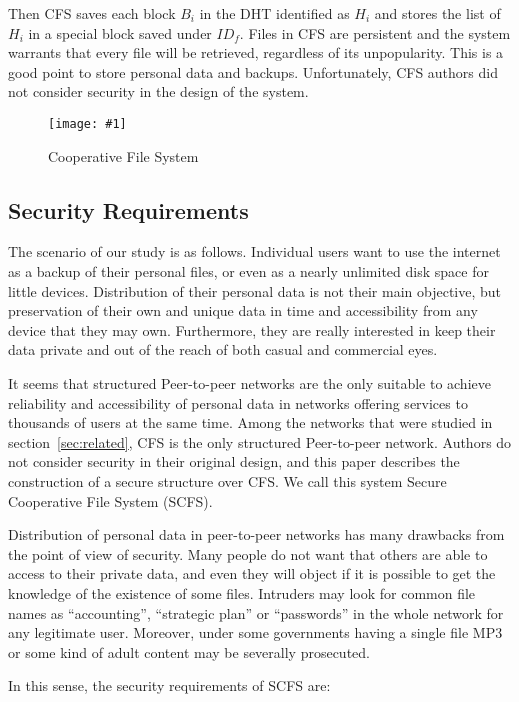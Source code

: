 \documentclass{llncs}
\newcommand{\graphfigure}[3]{%
\begin{figure}[t]%
	\centering%
	\texttt{[image: \#1]}%
	\caption{#2}%
	\label{#3}%
\end{figure}%
}
\begin{document}
Then CFS saves each block $B_i$ in the DHT identified as $H_i$ and stores the list of $H_i$ in a special block saved under $ID_f$. Files in CFS are persistent and the system warrants that every file will be retrieved, regardless of its unpopularity. This is a good point to store personal data and backups. Unfortunately, CFS authors did not consider security in the design of the system.

\graphfigure{cfs}{Cooperative File System}{fig:cfs}

\subsection{Security Requirements}
\label{sec:secobjectives}

The scenario of our study is as follows. Individual users want to use the internet as a backup of their personal files, or even as a nearly unlimited disk space for little devices. Distribution of their personal data is not their main objective, but preservation of their own and unique data in time and accessibility from any device that they may own. Furthermore, they are really interested in keep their data private and out of the reach of both casual and commercial eyes.

It seems that structured Peer-to-peer networks are the only suitable to achieve reliability and accessibility of personal data in networks offering services to thousands of users at the same time. Among the networks that were studied in section~\ref{sec:related}, CFS is the only structured Peer-to-peer network. Authors do not consider security in their original design, and this paper describes the construction of a secure structure over CFS. We call this system Secure Cooperative File System (SCFS).

Distribution of personal data in peer-to-peer networks has many drawbacks from the point of view of security. Many people do not want that others are able to access to their private data, and even they will object if it is possible to get the knowledge of the existence of some files. Intruders may look for common file names as ``accounting'', ``strategic plan'' or ``passwords'' in the whole network for any legitimate user. Moreover, under some governments having a single file MP3 or some kind of adult content may be severally prosecuted.

In this sense, the security requirements of SCFS are:
\end{document}
